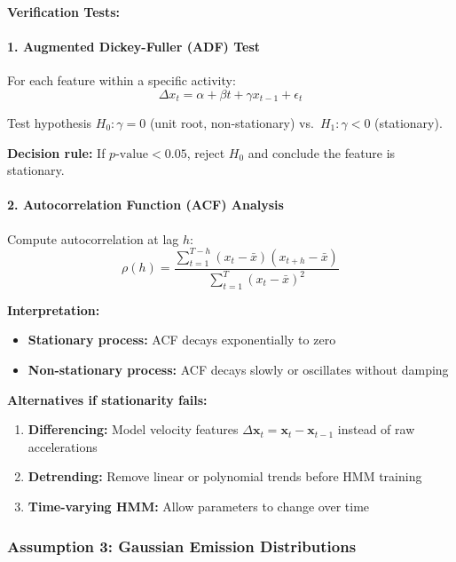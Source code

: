 \documentclass[11pt,a4paper]{article}
\newcommand{\bx}{\mathbf{x}}
\begin{document}
\textbf{Verification Tests:}

\paragraph{1. Augmented Dickey-Fuller (ADF) Test}

For each feature within a specific activity:
\begin{equation}
\Delta x_t = \alpha + \beta t + \gamma x_{t-1} + \epsilon_t
\end{equation}

Test hypothesis $H_0: \gamma = 0$ (unit root, non-stationary) vs.\ $H_1: \gamma < 0$ (stationary).

\textbf{Decision rule:} If $p\text{-value} < 0.05$, reject $H_0$ and conclude the feature is stationary.

\paragraph{2. Autocorrelation Function (ACF) Analysis}

Compute autocorrelation at lag $h$:
\begin{equation}
\rho(h) = \frac{\sum_{t=1}^{T-h} (x_t - \bar{x})(x_{t+h} - \bar{x})}{\sum_{t=1}^{T} (x_t - \bar{x})^2}
\end{equation}

\textbf{Interpretation:}
\begin{itemize}[leftmargin=*]
    \item \textbf{Stationary process:} ACF decays exponentially to zero
    \item \textbf{Non-stationary process:} ACF decays slowly or oscillates without damping
\end{itemize}

\textbf{Alternatives if stationarity fails:}
\begin{enumerate}[leftmargin=*]
    \item \textbf{Differencing:} Model velocity features $\Delta \bx_t = \bx_t - \bx_{t-1}$ instead of raw accelerations
    \item \textbf{Detrending:} Remove linear or polynomial trends before HMM training
    \item \textbf{Time-varying HMM:} Allow parameters to change over time
\end{enumerate}

\subsubsection{Assumption 3: Gaussian Emission Distributions}
\end{document}
